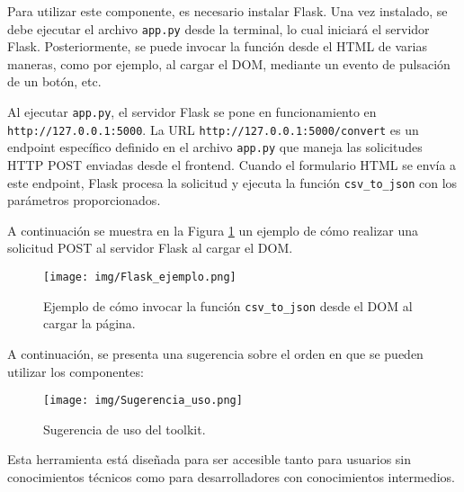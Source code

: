 \documentclass[a4paper, 12pt]{book}
\begin{document}
\vspace{1em} 
Para utilizar este componente, es necesario instalar Flask. Una vez instalado, se debe ejecutar el archivo \texttt{app.py} desde la terminal, lo cual iniciará el servidor Flask. Posteriormente, se puede invocar la función desde el HTML de varias maneras, como por ejemplo, al cargar el DOM, mediante un evento de pulsación de un botón, etc.

Al ejecutar \texttt{app.py}, el servidor Flask se pone en funcionamiento en \texttt{http://127.0.0.1:5000}. La URL \texttt{http://127.0.0.1:5000/convert} es un endpoint específico definido en el archivo \texttt{app.py} que maneja las solicitudes HTTP POST enviadas desde el frontend. Cuando el formulario HTML se envía a este endpoint, Flask procesa la solicitud y ejecuta la función \texttt{csv\_to\_json} con los parámetros proporcionados.

A continuación se muestra en la Figura \ref{fig:Flask_ejemplo} un ejemplo de cómo realizar una solicitud POST al servidor Flask al cargar el DOM.

\begin{figure}[H]
    \centering
    \texttt{[image: img/Flask\_ejemplo.png]}
    \caption{Ejemplo de cómo invocar la función \texttt{csv\_to\_json} desde el DOM al cargar la página.}
    \label{fig:Flask_ejemplo}
\end{figure}


A continuación, se presenta una sugerencia sobre el orden en que se pueden utilizar los componentes:

\begin{figure}[H]
\centering
\texttt{[image: img/Sugerencia\_uso.png]}
\caption{Sugerencia de uso del toolkit.}
\end{figure}

Esta herramienta está diseñada para ser accesible tanto para usuarios sin conocimientos técnicos como para desarrolladores con conocimientos intermedios. 





\cleardoublepage 


\end{document}
